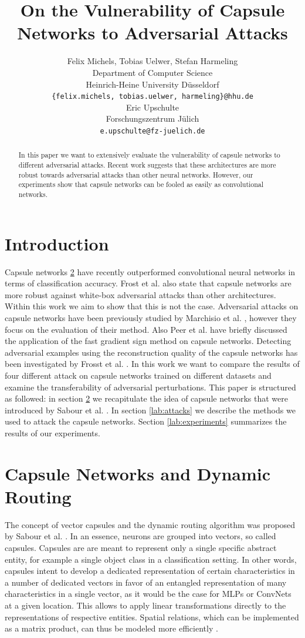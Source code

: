 \documentclass{article}
\title{On the Vulnerability of Capsule Networks to Adversarial Attacks}
\author{%
  Felix Michels, Tobias Uelwer, Stefan Harmeling \\
  Department of Computer Science\\
  Heinrich-Heine University Düsseldorf\\
  \texttt{\{felix.michels, tobias.uelwer, harmeling\}@hhu.de} \\
  \And
  Eric Upschulte \\
  Forschungszentrum Jülich \\
  \texttt{e.upschulte@fz-juelich.de} \\
}
\begin{document}
\maketitle

\begin{abstract}
	In this paper we want to extensively evaluate the vulnerability of capsule networks to different adversarial attacks. Recent work suggests that these architectures are more robust towards adversarial attacks than other neural networks. However, our experiments show that capsule networks can be fooled as easily as convolutional networks.

\end{abstract}

\section{Introduction}
Capsule networks \ref{lab:capsules} have recently outperformed convolutional neural networks in terms of classification accuracy. Frost et al. \cite{darccc} also state that capsule networks are more robust against white-box adversarial attacks than other architectures. Within this work we aim to show that this is not the case. Adversarial attacks on capsule networks have been previously studied by Marchisio et al. \cite{marchisio}, however they focus on the evaluation of their method. Also Peer et al. \cite{training} have briefly discussed the application of the fast gradient sign method \cite{fgsm} on capsule networks. Detecting adversarial examples using the reconstruction quality of the capsule networks has been investigated by Frosst et al. \cite{darccc}. In this work we want to compare the results of four different attack on capsule networks trained on different datasets and examine the transferability of adversarial perturbations. This paper is structured as followed: in section \ref{lab:capsules} we recapitulate the idea of capsule networks that were introduced by Sabour et al. \cite{capsules}. In section \ref{lab:attacks} we describe the methods we used to attack the capsule networks. Section \ref{lab:experiments} summarizes the results of our experiments.

\section{Capsule Networks and Dynamic Routing}
\label{lab:capsules}
The concept of vector capsules and the dynamic routing algorithm was proposed by Sabour et al. \cite{capsules}. In an essence, neurons are grouped into vectors, so called capsules. Capsules are are meant to represent only a single specific abstract entity, for example a single object class in a classification setting.
In other words, capsules intent to develop a dedicated representation of certain characteristics in a number of dedicated vectors in favor of an entangled representation of many characteristics in a single vector, as it would be the case for MLPs or ConvNets at a given location. This allows to apply linear transformations directly to the representations of respective entities. Spatial relations, which can be implemented as a matrix product, can thus be modeled more efficiently \cite{capsules}.
\end{document}
